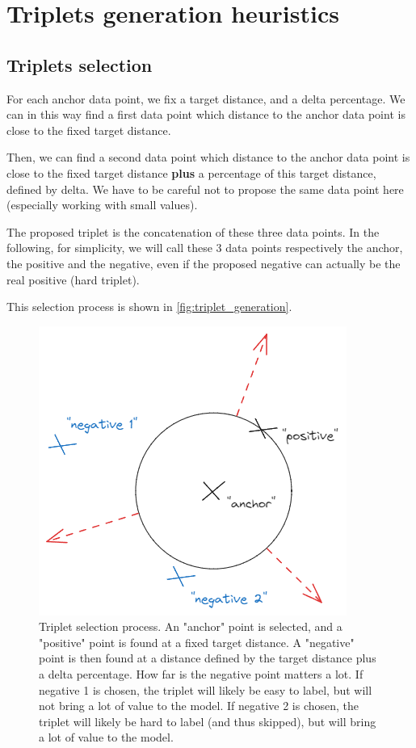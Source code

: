 \appendix
\label{sec:appendix}

\section{Triplets generation heuristics}
\label{sec:triplet-generation-heuristics}

\subsection{Triplets selection}

For each anchor data point, we fix a target distance, and a delta percentage.
We can in this way find a first data point which distance to the anchor data point is close to the fixed target distance.

Then, we can find a second data point which distance to the anchor data point is close to the fixed target distance \textbf{plus} a percentage of this target distance, defined by delta. We have to be careful not to propose the same data point here (especially working with small values).

The proposed triplet is the concatenation of these three data points. In the following, for simplicity, we will call these 3 data points respectively the anchor, the positive and the negative, even if the proposed negative can actually be the real positive (hard triplet).

This selection process is shown in \autoref{fig:triplet_generation}. 

\begin{figure}[]
    \centering
    \includegraphics[width=0.4\columnwidth]{images/triplet_generation.png}
    \caption{Triplet selection process. An "anchor" point is selected, and a "positive" point is found at a fixed target distance. A "negative" point is then found at a distance defined by the target distance plus a delta percentage. How far is the negative point matters a lot. If negative 1 is chosen, the triplet will likely be easy to label, but will not bring a lot of value to the model. If negative 2 is chosen, the triplet will likely be hard to label (and thus skipped), but will bring a lot of value to the model.}
    \label{fig:triplet_generation}
\end{figure}

